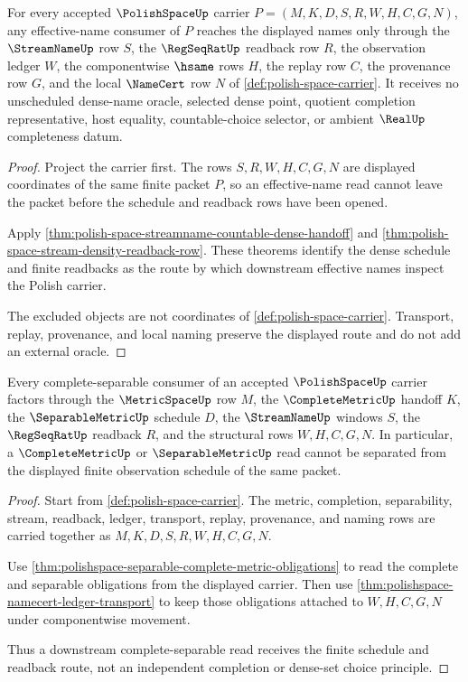 \begin{theorem}
\label{thm:polishspace-root-effective-name-obligations}
For every accepted $\PolishSpaceUp$ carrier $P=(M,K,D,S,R,W,H,C,G,N)$, any effective-name consumer of $P$ reaches the displayed names only through the $\StreamNameUp$ row $S$, the $\RegSeqRatUp$ readback row $R$, the observation ledger $W$, the componentwise $\hsame$ rows $H$, the replay row $C$, the provenance row $G$, and the local $\NameCert$ row $N$ of \autoref{def:polish-space-carrier}. It receives no unscheduled dense-name oracle, selected dense point, quotient completion representative, host equality, countable-choice selector, or ambient $\RealUp$ completeness datum.
\end{theorem}
\begin{proof}
Project the carrier first. The rows $S,R,W,H,C,G,N$ are displayed coordinates of the same finite packet $P$, so an effective-name read cannot leave the packet before the schedule and readback rows have been opened.

Apply \autoref{thm:polish-space-streamname-countable-dense-handoff} and \autoref{thm:polish-space-stream-density-readback-row}. These theorems identify the dense schedule and finite readbacks as the route by which downstream effective names inspect the Polish carrier.

The excluded objects are not coordinates of \autoref{def:polish-space-carrier}. Transport, replay, provenance, and local naming preserve the displayed route and do not add an external oracle.
\end{proof}

\begin{theorem}
\label{thm:polishspace-root-complete-separable-schedule}
Every complete-separable consumer of an accepted $\PolishSpaceUp$ carrier factors through the $\MetricSpaceUp$ row $M$, the $\CompleteMetricUp$ handoff $K$, the $\SeparableMetricUp$ schedule $D$, the $\StreamNameUp$ windows $S$, the $\RegSeqRatUp$ readback $R$, and the structural rows $W,H,C,G,N$. In particular, a $\CompleteMetricUp$ or $\SeparableMetricUp$ read cannot be separated from the displayed finite observation schedule of the same packet.
\end{theorem}
\begin{proof}
Start from \autoref{def:polish-space-carrier}. The metric, completion, separability, stream, readback, ledger, transport, replay, provenance, and naming rows are carried together as $M,K,D,S,R,W,H,C,G,N$.

Use \autoref{thm:polishspace-separable-complete-metric-obligations} to read the complete and separable obligations from the displayed carrier. Then use \autoref{thm:polishspace-namecert-ledger-transport} to keep those obligations attached to $W,H,C,G,N$ under componentwise movement.

Thus a downstream complete-separable read receives the finite schedule and readback route, not an independent completion or dense-set choice principle.
\end{proof}

